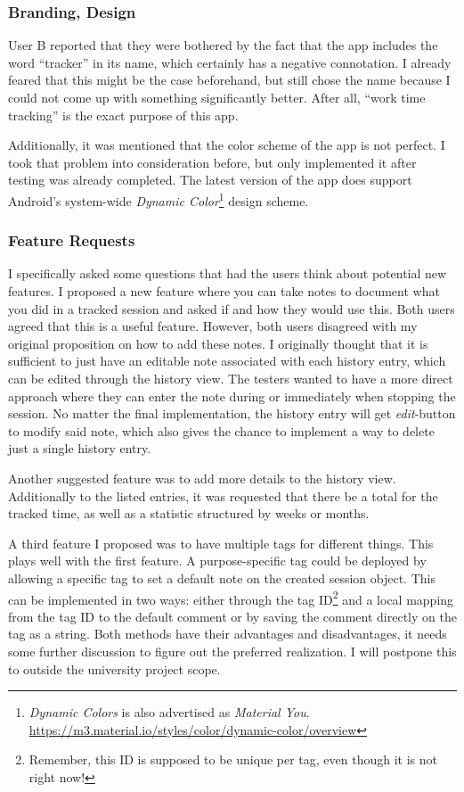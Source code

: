 \documentclass[conference]{IEEEtran}
\begin{document}
\subsubsection{Branding, Design}
User B reported that they were bothered by the fact that the app includes the word ``tracker'' in its name, which certainly has a negative connotation. I already feared that this might be the case beforehand, but still chose the name because I could not come up with something significantly better. After all, ``work time tracking'' is the exact purpose of this app.

Additionally, it was mentioned that the color scheme of the app is not perfect. I took that problem into consideration before, but only implemented it after testing was already completed. The latest version of the app does support Android's system-wide \textit{Dynamic Color}\footnote{\textit{Dynamic Colors} is also advertised as \textit{Material You}. \url{https://m3.material.io/styles/color/dynamic-color/overview}} design scheme.

\subsubsection{Feature Requests}
I specifically asked some questions that had the users think about potential new features. I proposed a new feature where you can take notes to document what you did in a tracked session and asked if and how they would use this. Both users agreed that this is a useful feature. However, both users disagreed with my original proposition on how to add these notes. I originally thought that it is sufficient to just have an editable note associated with each history entry, which can be edited through the history view. The testers wanted to have a more direct approach where they can enter the note during or immediately when stopping the session. No matter the final implementation, the history entry will get \textit{edit}-button to modify said note, which also gives the chance to implement a way to delete just a single history entry.

Another suggested feature was to add more details to the history view. Additionally to the listed entries, it was requested that there be a total for the tracked time, as well as a statistic structured by weeks or months.

A third feature I proposed was to have multiple tags for different things. This plays well with the first feature. A purpose-specific tag could be deployed by allowing a specific tag to set a default note on the created session object. This can be implemented in two ways: either through the tag ID\footnote{Remember, this ID is supposed to be unique per tag, even though it is not right now!} and a local mapping from the tag ID to the default comment or by saving the comment directly on the tag as a string. Both methods have their advantages and disadvantages, it needs some further discussion to figure out the preferred realization. I will postpone this to outside the  university project scope.
\end{document}
